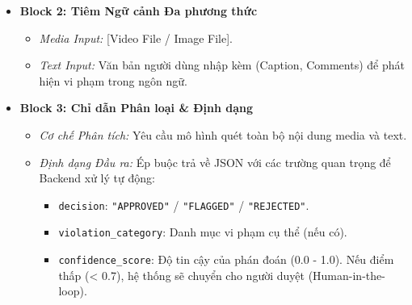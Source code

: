 \begin{itemize}
\begin{itemize}
        \item \textbf{Block 2: Tiêm Ngữ cảnh Đa phương thức}
        \begin{itemize}
            \item \textit{Media Input:} [Video File / Image File].
            \item \textit{Text Input:} Văn bản người dùng nhập kèm (Caption, Comments) để phát hiện vi phạm trong ngôn ngữ.
        \end{itemize}
        
        \item \textbf{Block 3: Chỉ dẫn Phân loại \& Định dạng}
        \begin{itemize}
            \item \textit{Cơ chế Phân tích:} Yêu cầu mô hình quét toàn bộ nội dung media và text.
            \item \textit{Định dạng Đầu ra:} Ép buộc trả về JSON với các trường quan trọng để Backend xử lý tự động:
            \begin{itemize}
                \item \texttt{decision}: \texttt{"APPROVED"} / \texttt{"FLAGGED"} / \texttt{"REJECTED"}.
                \item \texttt{violation\_category}: Danh mục vi phạm cụ thể (nếu có).
                \item \texttt{confidence\_score}: Độ tin cậy của phán đoán (0.0 - 1.0). Nếu điểm thấp (< 0.7), hệ thống sẽ chuyển cho người duyệt (Human-in-the-loop).
            \end{itemize}
        \end{itemize}
    \end{itemize}
\end{itemize}


